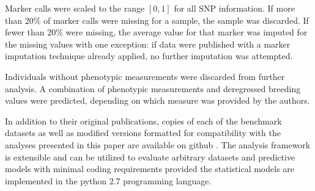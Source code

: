 \ifdefined\showtablesandfigures
\fi

Marker calls were scaled to the range $[0,1]$ for all SNP information. If more than 20\% of
marker calls were missing for a sample, the sample was discarded. If fewer than 20\% were missing,
the average value for that marker was imputed for the missing values with one exception: if data were 
published with a marker imputation technique already applied, no further imputation was attempted.

Individuals without phenotypic measurements were discarded from further analysis. A combination of phenotypic 
measurements and deregressed breeding values were predicted, depending on which measure was provided by the authors.

In addition to their original publications, copies of each of the benchmark datasets as well 
as modified versions formatted for compatibility with the analyses presented in 
this paper are available on github \citep{mcdowell2016}. The analysis framework 
is extensible and can be utilized to evaluate arbitrary datasets and predictive models
with minimal coding requirements provided the statistical models are implemented
in the python 2.7 programming language.

